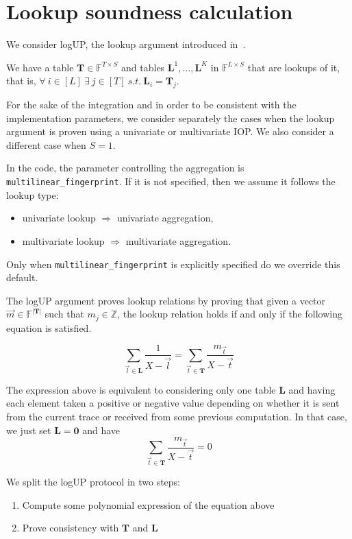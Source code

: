 \newpage
\section{Lookup soundness calculation}

We consider logUP, the lookup argument introduced in~\cite{habock2022logup}. 

We have a table $\mathbf{T}\in\mathbb{F}^{T\times S}$ and tables $\mathbf{L}^1, \ldots, \mathbf{L}^K$ in $\mathbb{F}^{L\times S}$ that are lookups of it, that is, $\forall \ i\in[L] \ \exists \ j\in[T] \ s.t. \ \mathbf L_i=\mathbf T_j$.

For the sake of the integration and in order to be consistent with the implementation parameters, we consider separately the cases when the lookup argument is proven using a univariate or multivariate IOP. We also consider a different case when $S=1$.

In the code, the parameter controlling the aggregation is \texttt{multilinear\_fingerprint}. If it is not specified, then we assume it follows the lookup type:
\begin{itemize}
	\item univariate lookup $\Rightarrow$ univariate aggregation,
	\item multivariate lookup $\Rightarrow$ multivariate aggregation.
\end{itemize}
Only when \texttt{multilinear\_fingerprint} is explicitly specified do we override this default.

The logUP argument proves lookup relations by proving that given a vector $\vec m\in\mathbb{F}^{|\mathbf T|}$ such that $m_j\in\mathbb{Z}$, the lookup relation holds if and only if the following equation is satisfied.

$$\sum_{\vec l\in\mathbf{L}} \frac{1}{X-  \vec l}=\sum_{\vec t \in \mathbf{T}} \frac{m_{\vec t}}{X- \vec t}$$

The expression above is equivalent to considering only one table $\mathbf L$ and having each element taken a positive or negative value depending on whether it is sent from the current trace or received from some previous computation. In that case, we just set $\mathbf{L}=\mathbf 0$ and have
$$\sum_{\vec t \in \mathbf{T}} \frac{m_{\vec t}}{X- \vec t}=0$$

We split the logUP protocol in two steps:

\begin{enumerate}
	\item Compute some polynomial expression of the equation above
	\item Prove consistency with $\mathbf T$ and $\mathbf L$	
\end{enumerate}



